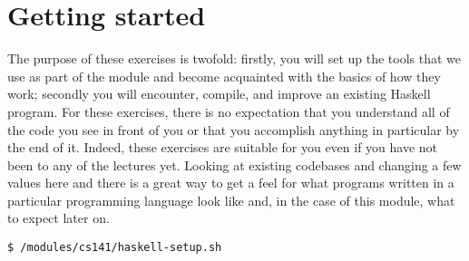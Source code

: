 \section{Getting started}

The purpose of these exercises is twofold: firstly, you will set up the tools that we use as part of the module and become acquainted with the basics of how they work; secondly you will encounter, compile, and improve an existing Haskell program. For these exercises, there is no expectation that you understand all of the code you see in front of you or that you accomplish anything in particular by the end of it. Indeed, these exercises are suitable for you even if you have not been to any of the lectures yet. Looking at existing codebases and changing a few values here and there is a great way to get a feel for what programs written in a particular programming language look like and, in the case of this module, what to expect later on. 

\taskLine

\begin{verbatim}
$ /modules/cs141/haskell-setup.sh
\end{verbatim}

\taskLine


